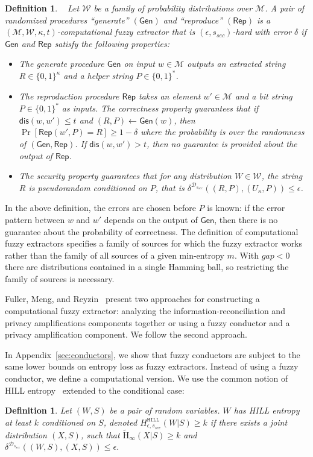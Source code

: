 \documentclass[11pt]{article}
\newcommand{\apref}[1]{\mbox{Appendix~\ref{#1}}}
\newcommand{\class}[1]{{\ensuremath{\mathsf{#1}}}}
\newcommand{\gen}{\ensuremath{\class{Gen}}\xspace}
\newcommand{\rep}{\ensuremath{\class{Rep}}\xspace}
\newcommand{\dis}{\ensuremath{\mathsf{dis}}}
\newcommand{\hill}{\ensuremath{\mathtt{HILL}}\xspace}
\newcommand{\Hav}{\tilde{\mathrm{H}}_\infty}
\newtheorem{definition}[theorem]{Definition}
\begin{document}
\begin{definition}~\cite[Definition 2.5]{fuller2013computational}
\label{def:comp fuzzy extractor}
Let $\mathcal{W}$ be a family of probability distributions over $\mathcal{M}$. A pair of randomized procedures ``generate'' $(\gen)$ and ``reproduce'' $(\rep)$ is a $(\mathcal{M}, \mathcal{W}, \kappa, t)$-\emph{computational fuzzy extractor} that is $(\epsilon, s_{sec})$-hard with error $\delta$ if \gen and \rep satisfy the following properties:
\begin{itemize}
\item The generate procedure \gen on input $w\in \mathcal{M}$ outputs an extracted string $R\in\{0,1\}^\kappa$ and a helper string $P\in\{0,1\}^*$.
\item The reproduction procedure \rep takes an element $w'\in\mathcal{M}$ and a bit string $P\in\{0,1\}^*$ as inputs.  The \emph{correctness} property guarantees that if $\dis(w, w')\leq t$ and $(R, P)\leftarrow \gen(w)$, then $\Pr[\rep( w', P) = R] \geq 1-\delta$ where the probability is over the randomness of $(\gen, \rep)$.  
If $\dis(w, w') > t$, then no guarantee is provided about the output of \rep.
\item The \emph{security} property guarantees that for any distribution $W\in \mathcal{W}$, the string $R$ is pseudorandom conditioned on $P$, that is $\delta^{\mathcal{D}_{s_{sec}}}((R, P), (U_\kappa, P))\leq \epsilon$.
\end{itemize}
\end{definition}
In the above definition, the errors are chosen before $P$ is known: if the error pattern between $w$ and $w'$ depends on the output of $\gen$, then there is no guarantee about the probability of correctness.
The definition of computational fuzzy extractors specifies a family of sources for which the fuzzy extractor works rather than the family of all sources of a given min-entropy $m$.  With $gap<0$ there are distributions contained in a single Hamming ball, so restricting the family of sources is necessary.

Fuller, Meng, and Reyzin~\cite{fuller2013computational} present two approaches for constructing a computational fuzzy extractor: analyzing the information-reconciliation and privacy amplifications components together or using a fuzzy conductor and a privacy amplification component.  We follow the second approach.  

In \apref{sec:conductors}, we show that fuzzy conductors are subject to the same lower bounds on entropy loss as fuzzy extractors.  Instead of using a fuzzy conductor, we define a computational version.  
We use the common notion of HILL entropy~\cite{DBLP:journals/siamcomp/HastadILL99} extended to the conditional case:
\begin{definition}
\label{def:hill ent}
Let $(W, S)$ be a pair of random variables.  $W$ has 
\emph{HILL entropy} at least $k$ conditioned on $S$,
denoted $H^{\hill}_{\epsilon, s_{sec}}(W|S)\geq k$ if there exists a joint distribution $(X, S)$, such that $\Hav(X|S)\geq k$ and $\delta^{\mathcal{D}_{s_{sec}}} ((W, S),(X,S))\leq \epsilon$.
\end{definition}
\end{document}
